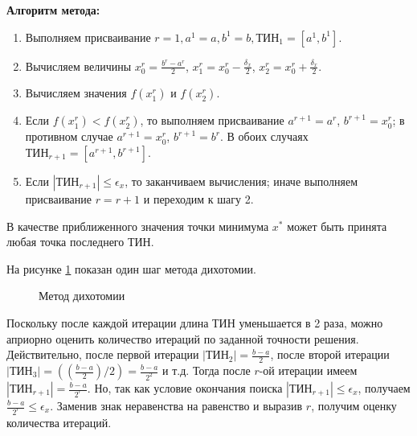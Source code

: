 \documentclass[a4paper,12pt]{report}
\begin{document}
\textbf{Алгоритм метода:}
\begin{enumerate}
\item Выполняем присваивание $r = 1, a^{1} = a, b^{1} = b, \text{ТИН}_{1} = \left[a^{1}, b^{1}\right]$.
\item Вычисляем величины $x^{r}_{0} = \frac{b^{r}-a^{r}}{2}$, $x^{r}_{1} = x^{r}_{0} - \frac{\delta_{x}}{2}$, $x^{r}_{2} = x^{r}_{0} + \frac{\delta_{x}}{2}$.
\item Вычисляем значения $f(x^{r}_{1})$ и $f(x^{r}_{2})$.
\item Если $f(x^{r}_{1}) < f(x^{r}_{2})$, то выполняем присваивание $a^{r+1} = a^{r}$, $b^{r+1} = x^{r}_{0}$; в противном случае $a^{r+1} = x^{r}_{0}$, $b^{r+1} = b^{r}$. В обоих случаях $\text{ТИН}_{r+1} = \left[a^{r+1}, b^{r+1}\right]$.
\item Если $\left|\text{ТИН}_{r+1}\right| \leq \epsilon_{x}$, то заканчиваем вычисления; иначе выполняем присваивание $r = r + 1$ и переходим к шагу 2.
\end{enumerate}
В качестве приближенного значения точки минимума $x^{*}$ может быть принята любая точка последнего ТИН.

На рисунке \ref{fig:dihotom_search} показан один шаг метода дихотомии.

\begin{figure}[ht]
\caption{Метод дихотомии}
\label{fig:dihotom_search}
\end{figure}

Поскольку после каждой итерации длина ТИН уменьшается в 2 раза, можно априорно оценить количество итераций по заданной точности решения. Действительно, после первой итерации $\left|\text{ТИН}_{2}\right| = \frac{b-a}{2}$, после второй итерации $\left|\text{ТИН}_{3}\right| = ((\frac{b-a}{2})/2) = \frac{b-a}{2^{2}}$ и т.д. Тогда после $r$-ой итерации имеем $\left|\text{ТИН}_{r+1}\right| = \frac{b-a}{2^{r}}$. Но, так как условие окончания поиска $\left|\text{ТИН}_{r+1}\right| \leq \epsilon_{x}$, получаем $\frac{b-a}{2^{r}} \leq \epsilon_{x}$. Заменив знак неравенства на равенство и выразив $r$, получим оценку количества итераций.
\end{document}
